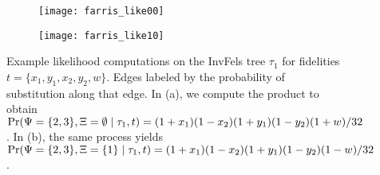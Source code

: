 \begin{figure}
\centering
\begin{subfigure}{.45\linewidth}
\centering
\texttt{[image: farris\_like00]}
\caption[short]{}
\end{subfigure}
\begin{subfigure}{.45\linewidth}
\centering
\texttt{[image: farris\_like10]}
\caption[short]{}
\end{subfigure}
\caption{
    Example likelihood computations on the InvFels tree $\tau_1$ for fidelities $t=\{x_1,y_1,x_2,y_2,w\}$.
    Edges labeled by the probability of substitution along that edge.
    In (a), we compute the product to obtain $\Pr(\Psi=\{2,3\},\Xi=\emptyset\mid \tau_1,t) = (1+x_1)(1-x_2)(1+y_1)(1-y_2)(1+w)/32$.
    In (b), the same process yields $\Pr(\Psi=\{2,3\},\Xi=\{1\}\mid \tau_1,t) = (1+x_1)(1-x_2)(1+y_1)(1-y_2)(1-w)/32$.
}
\label{fig:example_likelihoods}
\end{figure}

